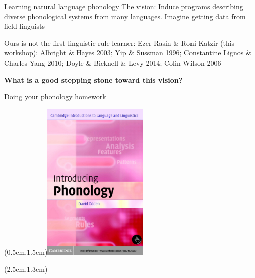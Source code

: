 \documentclass{beamer}
\begin{document}
\begin{frame}{Learning natural language phonology}
  The vision: Induce programs describing diverse phonological systems from many languages. Imagine getting data from field linguists

  \vspace{1cm}
Ours is not the first linguistic rule learner: Ezer Rasin \&  Roni Katzir (this workshop); Albright \& Hayes 2003; Yip \& Sussman 1996; Constantine Lignos \& Charles Yang 2010; Doyle \& Bicknell \& Levy 2014; Colin Wilson 2006

\vspace{1cm}

\large \textbf{What is a good stepping stone toward this vision?}
  \end{frame}

\begin{frame}{Doing your phonology homework}

  \begin{textblock*}{10cm}(0.5cm,1.5cm)\includegraphics[width=5cm]{phonologyCover.png}\end{textblock*}

  \begin{textblock*}{10cm}(2.5cm,1.3cm)\end{textblock*}


\end{frame}
\end{document}
